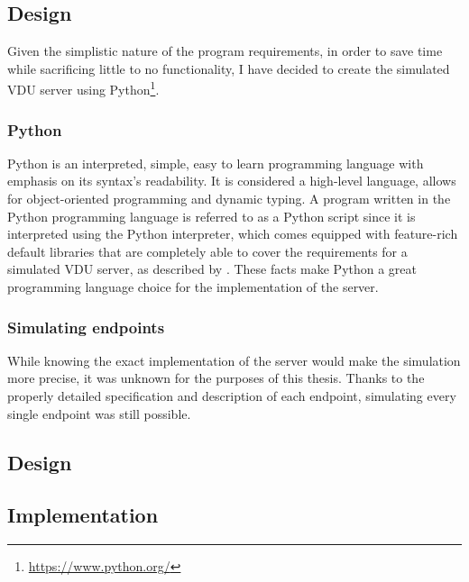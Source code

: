 \subsection{Design}
Given the simplistic nature of the program requirements, in order to save time while sacrificing little to no functionality, I have decided to create the simulated VDU server using Python\footnote{\url{https://www.python.org/}}.

\subsubsection{Python}
Python is an interpreted, simple, easy to learn programming language with emphasis on its syntax's readability. It is considered a high-level language, allows for object-oriented programming and dynamic typing. A program written in the Python programming language is referred to as a Python script since it is interpreted using the Python interpreter, which comes equipped with feature-rich default libraries that are completely able to cover the requirements for a simulated VDU server, as described by \cite{PythonWhatis}. These facts make Python a great programming language choice for the implementation of the server.
\subsubsection{Simulating endpoints}
 While knowing the exact implementation of the server would make the simulation more precise, it was unknown for the purposes of this thesis. Thanks to the properly detailed specification and description of each endpoint, simulating every single endpoint was still possible.
 
\subsection{Design}
 
\subsection{Implementation}
 
